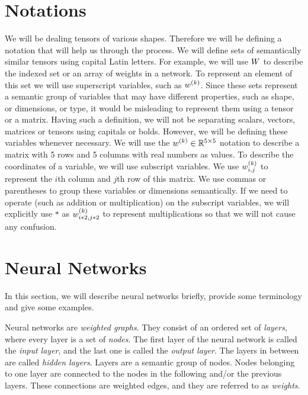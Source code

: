 \section{Notations}
We will be dealing tensors of various shapes. Therefore we will be defining a notation that will help us through the process. We will define sets of semantically similar tensors using capital Latin letters. For example, we will use $\all\weights$ to describe the indexed set or an array of weights in a network. To represent an element of this set we will use superscript variables, such as $w^{(k)}$. Since these sets represent a semantic group of variables that may have different properties, such as shape, or dimensions, or type, it would be misleading to represent them using a tensor or a matrix. Having such a definition, we will not be separating scalars, vectors, matrices or tensors using capitals or bolds. However, we will be defining these variables whenever necessary. We will use the $w^{(k)} \in \mathbb{R}^{5 \times 5}$ notation to describe a matrix with 5 rows and 5 columns with real numbers as values. To describe the coordinates of a variable, we will use subscript variables. We use $w^{(k)}_{i,j}$ to represent the $i$th column and $j$th row of this matrix. We use commas or parentheses to group these variables or dimensions semantically. If we need to operate (such as addition or multiplication) on the subscript variables, we will explicitly use $*$ as $w^{(k)}_{i*2, j*2}$ to represent multiplications so that we will not cause any confusion. 

\section{Neural Networks}
In this section, we will describe neural networks briefly, provide some terminology and give some examples. 

Neural networks are \textit{weighted graphs}. They consist of an ordered set of \textit{layers}, where every layer is a set of \textit{nodes}. The first layer of the neural network is called the \textit{input layer}, and the last one is called the \textit{output layer}. The layers in between are called \textit{hidden layers}. Layers are a semantic group of nodes. Nodes belonging to one layer are connected to the nodes in the following and/or the previous layers. These connections are weighted edges, and they are referred to as \textit{weights}. 

